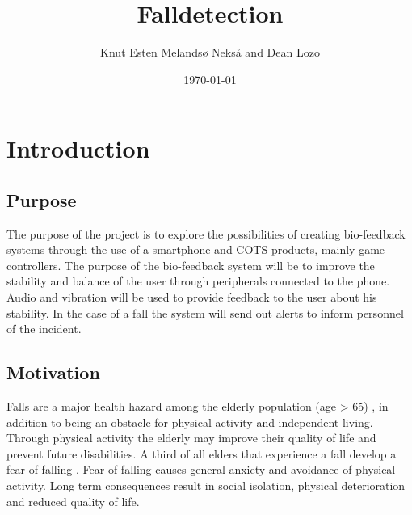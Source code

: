 \documentclass[11pt,twoside,a4paper]{report}
\begin{document}
\title{Falldetection}
\author{Knut Esten Melandsø Nekså and Dean Lozo}
\date{\today}
\maketitle


\begin{abstract}

\end{abstract}

\tableofcontents

\chapter{Introduction}

\section{Purpose}
The purpose of the project is to explore the possibilities of creating bio-feedback systems through the use of a smartphone and COTS products, mainly game controllers. The purpose of the bio-feedback system will be to improve the stability and balance of the user through peripherals connected to the phone. Audio and vibration will be used to provide feedback to the user about his stability. In the case of a fall the system will send out alerts to inform personnel of the incident.

\section{Motivation}
Falls are a major health hazard among the elderly population (age > 65) \cite{fallsHealthHazard}, in addition to being an obstacle for physical activity and independent living. Through physical activity the elderly may improve their quality of life and prevent future disabilities\cite{physicalActivity}. A third of all elders that experience a fall develop a fear of falling \cite{fearOfFalling}. Fear of falling causes general anxiety and avoidance of physical activity. Long term consequences result in social isolation, physical deterioration and reduced quality of life.\cite{physicalAvoidance} %
\end{document}
